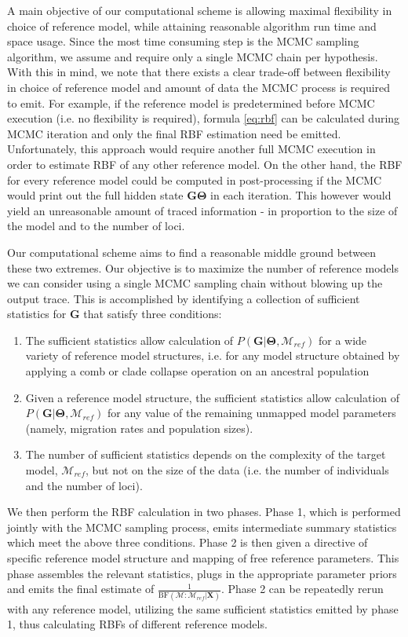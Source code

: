 \documentclass[11pt]{article}
\newcommand{\vect}[1]{\boldsymbol{\mathbf{#1}}}
\newcommand{\X}{\vect{X}}
\newcommand{\M}{\mathcal{M}}
\newcommand{\G}{\vect{G}}
\newcommand{\T}{\vect{\Theta}}
\newcommand{\GT}{\G\T}
\newcommand{\Mref}{\M_{ref}}
\newcommand{\rbf}{\text{BF}}
\newcommand{\1}{\mathbbm{1}}
\begin{document}
A main objective of our computational scheme is allowing maximal flexibility in choice of reference model, while attaining reasonable algorithm run time and space usage.
%
Since the most time consuming step is the MCMC sampling algorithm, we assume and require only a single MCMC chain per hypothesis.
%
With this in mind, we note that there exists a clear trade-off between flexibility in choice of reference model and amount of data the MCMC process is required to emit. 
%
For example, if the reference model is predetermined before MCMC execution (i.e. no flexibility is required), formula \ref{eq:rbf} can be calculated during MCMC iteration and only the final RBF estimation need be emitted.
%
Unfortunately, this approach would require another full MCMC execution in order to estimate RBF of any other reference model.
%
On the other hand, the RBF for every reference model could be computed in post-processing if the MCMC would print out the full hidden state $\GT$ in each iteration.
%
This however would yield an unreasonable amount of traced information - in proportion to the size of the model and to the number of loci.


Our computational scheme aims to find a reasonable middle ground between these two extremes.
%
Our objective is to maximize the number of reference models we can consider using a single MCMC sampling chain without blowing up the output trace.
%
This is accomplished by identifying a collection of sufficient statistics for $\G$ that satisfy three conditions:
%
\begin{enumerate}
 \item The sufficient statistics allow calculation of $P(\G|\T,\Mref)$ for a wide variety of reference model structures, i.e. for any model structure obtained by applying a comb or clade collapse operation on an ancestral population
 \item Given a reference model structure, the sufficient statistics allow calculation of $P(\G|\T,\Mref)$ for any value of the remaining unmapped model parameters (namely, migration rates and population sizes).
 \item The number of sufficient statistics depends on the complexity of the target model, $\Mref$, but not on the size of the data (i.e. the number of individuals and the number of loci).
\end{enumerate}
%

We then perform the RBF calculation in two phases. 
%
Phase 1, which is performed jointly with the MCMC sampling process, emits intermediate summary statistics which meet the above three conditions. 
%
Phase 2 is then given a directive of specific reference model structure and mapping of free reference parameters. This phase assembles the relevant statistics, plugs in the appropriate parameter priors and emits the final estimate of $ \frac{1}{\rbf(\M:\Mref|\X)}$. 
%
Phase 2 can be repeatedly rerun with any reference model, utilizing the same sufficient statistics emitted by phase 1, thus calculating RBFs of different reference models.
\end{document}
